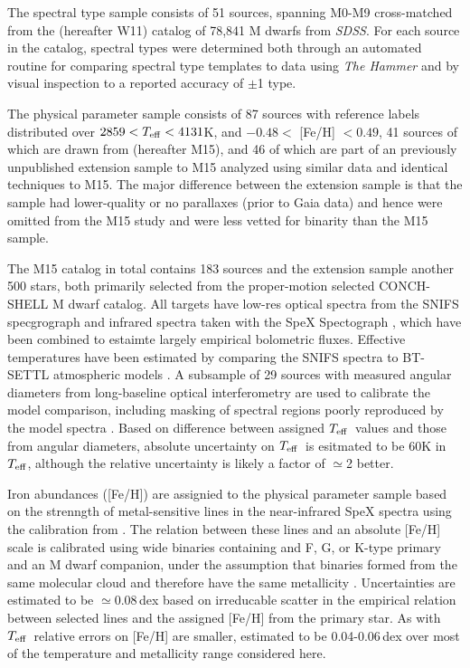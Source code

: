 \documentclass[modern]{aastex62}
\newcommand{\sdss}{\textsl{SDSS}}
\newcommand{\teff}{$T_{\rm eff}$}
\begin{document}
The spectral type sample consists of 51 sources, spanning M0-M9 cross-matched from the \citealt{West:2011} (hereafter W11) catalog of 78,841 M dwarfs from \sdss. For each source in the catalog, spectral types were determined both through an automated routine for comparing spectral type templates to data using \textsl{The Hammer} \citep{Covey:2007} and by visual inspection to a reported accuracy of $\pm$1 type.

The physical parameter sample consists of 87 sources with reference labels distributed over $2859 <T_{\rm eff} < 4131$K, and $-0.48 <$ [Fe/H] $< 0.49$, 41 sources of which are drawn from \citealt{Mann:2015} (hereafter M15), and 46 of which are part of an previously unpublished extension sample to M15 analyzed using similar data and identical techniques to M15. The major difference between the extension sample is that the sample had lower-quality or no parallaxes (prior to Gaia data) and hence were omitted from the M15 study and were less vetted for binarity than the M15 sample.

The M15 catalog in total contains 183 sources and the extension sample another 500 stars, both primarily selected from the proper-motion selected CONCH-SHELL \citep{Gaidos:2013} M dwarf catalog. All targets have low-res optical spectra from the SNIFS specgrograph \citep{Lantz:2004} and infrared spectra taken with the SpeX Spectograph \citep{Rayner:2003}, which have been combined to estaimte largely empirical bolometric fluxes. Effective temperatures have been estimated by comparing the SNIFS spectra to BT-SETTL atmospheric models \citep{Allard:2011}. A subsample of 29 sources with measured angular diameters from long-baseline optical interferometry \citep{Boyajian:2012} are used to calibrate the model comparison, including masking of spectral regions poorly reproduced by the model spectra \citep{Mann:2013c}. Based on difference between assigned \teff\ values and those from angular diameters, absolute uncertainty on \teff\ is esitmated to be 60K in \teff, although the relative uncertainty is likely a factor of $\simeq$2 better.

Iron abundances ([Fe/H]) are assignied to the physical parameter sample based on the strenngth of metal-sensitive lines in the near-infrared SpeX spectra \citep{RojasAyala:2010} using the calibration from \citet{Mann:2013a}. The relation between these lines and an absolute [Fe/H] scale is calibrated using wide binaries containing and F, G, or K-type primary and an M dwarf companion, under the assumption that binaries formed from the same molecular cloud and therefore have the same metallicity \citep{Bonfils:2005}. Uncertainties are estimated to be $\simeq$0.08\,dex based on irreducable scatter in the empirical relation between selected lines and the assigned [Fe/H] from the primary star. As with \teff\ relative errors on [Fe/H] are smaller, estimated to be 0.04-0.06\,dex over most of the temperature and metallicity range considered here.
\end{document}
